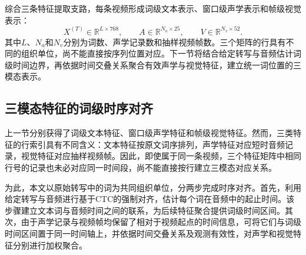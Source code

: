 综合三条特征提取支路，每条视频形成词级文本表示、窗口级声学表示和帧级视觉表示：
\begin{equation}
    X^{(T)}\in\mathbb{R}^{L\times768},\qquad
    A\in\mathbb{R}^{N_a\times25},\qquad
    V\in\mathbb{R}^{N_v\times52}.
    \label{eq:p1_native_features}
\end{equation}
其中$L$、$N_a$和$N_v$分别为词数、声学记录数和抽样视频帧数。三个矩阵的行具有不同的组织单位，尚不能直接按序列位置对应。下一节将结合给定转写与音频估计词级时间边界，再依据时间交叠关系聚合有效声学与视觉特征，建立统一词位置的三模态表示。







\subsection{三模态特征的词级时序对齐}


上一节分别获得了词级文本特征、窗口级声学特征和帧级视觉特征。然而，三类特征的行索引具有不同含义：文本特征按原文词序排列，声学特征对应短时音频记录，视觉特征对应抽样视频帧。因此，即使属于同一条视频，三个特征矩阵中相同行号的记录也未必对应同一时间段，尚不能直接按行建立三模态对应关系。

为此，本文以原始转写中的词为共同组织单位，分两步完成时序对齐。首先，利用给定转写与音频进行基于CTC的强制对齐，估计每个词在音频中的起止时间。该步骤建立文本词与音频时间之间的联系，为后续特征聚合提供词级时间区间。其次，由于声学记录与视频帧均保留了相对于视频起点的时间信息，可将它们与词级时间区间置于同一时间轴上，并依据时间交叠关系及观测有效性，对声学和视觉特征分别进行加权聚合。

